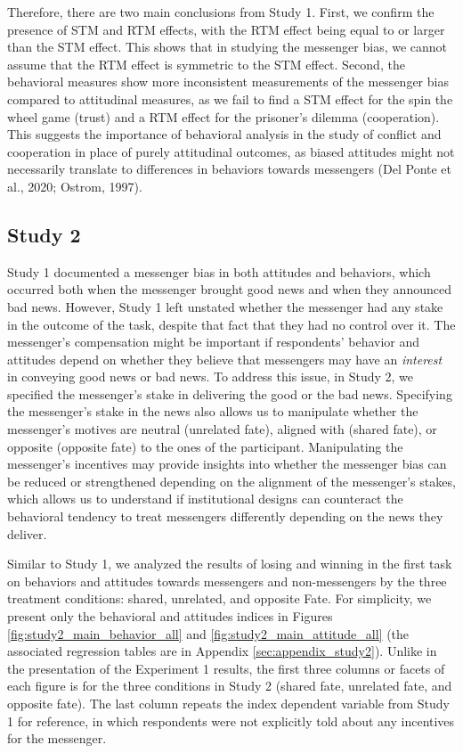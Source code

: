 Therefore, there are two main conclusions from Study 1. First, we confirm
the presence of STM and RTM effects, with the RTM effect being equal to
or larger than the STM effect. This shows that in studying the messenger
bias, we cannot assume that the RTM effect is symmetric to the STM
effect. Second, the behavioral measures show more inconsistent
measurements of the messenger bias compared to attitudinal measures, as
we fail to find a STM effect for the spin the wheel game (trust) and a
RTM effect for the prisoner's dilemma (cooperation). This suggests the
importance of behavioral analysis in the study of conflict and
cooperation in place of purely attitudinal outcomes, as biased attitudes
might not necessarily translate to differences in behaviors towards
messengers (Del Ponte et al., 2020; Ostrom, 1997).

\subsection{Study 2}

Study 1 documented a messenger bias in both attitudes and behaviors,
which occurred both when the messenger brought good news and when they
announced bad news. However, Study 1 left unstated whether the messenger
had any stake in the outcome of the task, despite that fact that they
had no control over it. The messenger's compensation might be important
if respondents' behavior and attitudes depend on whether they believe that
messengers may have an \emph{interest} in conveying good news or bad
news. To address this issue, in Study 2, we specified the messenger's
stake in delivering the good or the bad news. Specifying the messenger's
stake in the news also allows us to manipulate whether the messenger's
motives are neutral (unrelated fate), aligned with (shared fate), or
opposite (opposite fate) to the ones of the participant. Manipulating
the messenger's incentives may provide insights into whether the
messenger bias can be reduced or strengthened depending on the alignment
of the messenger's stakes, which allows us to understand if
institutional designs can counteract the behavioral tendency to treat
messengers differently depending on the news they deliver.

Similar to Study 1, we analyzed the results of losing and winning in the first task on behaviors and attitudes towards messengers and non-messengers by the three treatment conditions: shared, unrelated, and opposite Fate. For simplicity, we present only the behavioral and attitudes
indices in Figures \ref{fig:study2_main_behavior_all} and \ref{fig:study2_main_attitude_all} (the associated regression
tables are in Appendix \ref{sec:appendix_study2}). Unlike in the presentation of the Experiment
1 results, the first three columns or facets of each figure is for the
three conditions in Study 2 (shared fate, unrelated fate, and opposite
fate). The last column repeats the index dependent variable from
Study 1 for reference, in which respondents were not explicitly told about any
incentives for the messenger.

